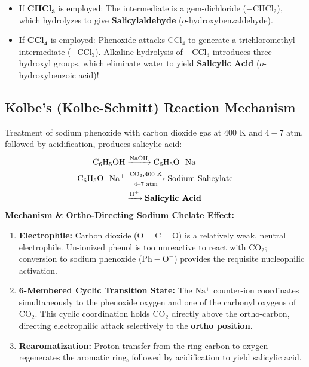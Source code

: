 \documentclass[10pt,twoside,openright]{book}
\begin{document}
\begin{trapbox}
\begin{itemize}
  \item If $\mathbf{CHCl_3}$ is employed: The intermediate is a gem-dichloride ($-\mathrm{CHCl_2}$), which hydrolyzes to give \textbf{Salicylaldehyde} ($o$-hydroxybenzaldehyde).
  \item If $\mathbf{CCl_4}$ is employed: Phenoxide attacks $\mathrm{CCl_4}$ to generate a trichloromethyl intermediate ($-\mathrm{CCl_3}$). Alkaline hydrolysis of $-\mathrm{CCl_3}$ introduces three hydroxyl groups, which eliminate water to yield \textbf{Salicylic Acid} ($o$-hydroxybenzoic acid)!
\end{itemize}
\end{trapbox}

\subsection{Kolbe's (Kolbe-Schmitt) Reaction Mechanism}

\begin{conceptbox}
Treatment of sodium phenoxide with carbon dioxide gas at $400\text{ K}$ and $4-7\text{ atm}$, followed by acidification, produces salicylic acid:
\begin{align*}
  \mathrm{C_6H_5OH} &\xrightarrow{\mathrm{NaOH}} \mathrm{C_6H_5O^-Na^+}\\
  \mathrm{C_6H_5O^-Na^+} &\xrightarrow[\text{4--7 atm}]{\mathrm{CO_2, 400\text{ K}}} \text{Sodium Salicylate} \\
  &\xrightarrow{\mathrm{H^+}} \text{\textbf{Salicylic Acid}}
\end{align*}
\textbf{Mechanism \& Ortho-Directing Sodium Chelate Effect:}
\begin{enumerate}[leftmargin=*]
  \item \textbf{Electrophile:} Carbon dioxide ($\mathrm{O=C=O}$) is a relatively weak, neutral electrophile. Un-ionized phenol is too unreactive to react with $\mathrm{CO_2}$; conversion to sodium phenoxide ($\mathrm{Ph-O^-}$) provides the requisite nucleophilic activation.
  \item \textbf{6-Membered Cyclic Transition State:} The $\mathrm{Na^+}$ counter-ion coordinates simultaneously to the phenoxide oxygen and one of the carbonyl oxygens of $\mathrm{CO_2}$. This cyclic coordination holds $\mathrm{CO_2}$ directly above the ortho-carbon, directing electrophilic attack selectively to the \textbf{ortho position}.
  \item \textbf{Rearomatization:} Proton transfer from the ring carbon to oxygen regenerates the aromatic ring, followed by acidification to yield salicylic acid.
\end{enumerate}
\end{conceptbox}
\end{document}
